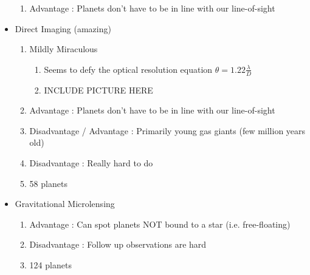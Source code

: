 \documentclass{beamer}
\begin{document}
\begin{frame}
\begin{itemize}
\begin{enumerate}
            \item Advantage : Planets don't have to be in line with our line-of-sight
        \end{enumerate}
    \pause
    \item Direct Imaging (amazing)
        \pause
        \begin{enumerate}
            \item Mildly Miraculous 
                \begin{enumerate}
                    \item Seems to defy the optical resolution equation $\theta = 1.22 \frac{\lambda}{D}$
                    \item INCLUDE PICTURE HERE
                \end{enumerate}
            \pause
            \item Advantage : Planets don't have to be in line with our line-of-sight
            \pause
            \item Disadvantage / Advantage : Primarily young gas giants (few million years old)
            \pause
            \item Disadvantage : Really hard to do
            \pause
            \item 58 planets
        \end{enumerate}
    \item Gravitational Microlensing
        \pause
        \begin{enumerate}
            \item Advantage : Can spot planets NOT bound to a star (i.e. free-floating)
            \pause
            \item Disadvantage : Follow up observations are hard
            \item 124 planets
        \end{enumerate}
\end{itemize}
\end{frame}
\end{document}

